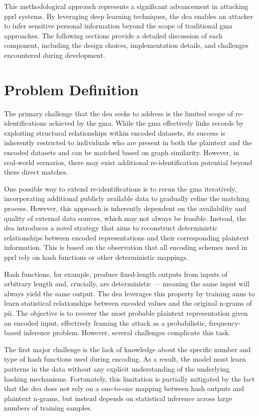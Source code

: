 This methodological approach represents a significant advancement in attacking \ac{pprl} systems.
By leveraging deep learning techniques, the \ac{dea} enables an attacker to infer sensitive personal information beyond the scope of traditional \ac{gma} approaches.
The following sections provide a detailed discussion of each component, including the design choices, implementation details, and challenges encountered during development.

\section{Problem Definition} \label{sec:problemdefinition}

The primary challenge that the \ac{dea} seeks to address is the limited scope of re-identifications achieved by the \ac{gma}.
While the \ac{gma} effectively links records by exploiting structural relationships within encoded datasets, its success is inherently restricted to individuals who are present in both the plaintext and the encoded datasets and can be matched based on graph similarity.
However, in real-world scenarios, there may exist additional re-identification potential beyond these direct matches.

One possible way to extend re-identifications is to rerun the \ac{gma} iteratively, incorporating additional publicly available data to gradually refine the matching process.
However, this approach is inherently dependent on the availability and quality of external data sources, which may not always be feasible.
Instead, the \ac{dea} introduces a novel strategy that aims to reconstruct deterministic relationships between encoded representations and their corresponding plaintext information.
This is based on the observation that all encoding schemes used in \ac{pprl} rely on hash functions or other deterministic mappings.

Hash functions, for example, produce fixed-length outputs from inputs of arbitrary length and, crucially, are deterministic — meaning the same input will always yield the same output.
The \ac{dea} leverages this property by training \ac{ann}s to learn statistical relationships between encoded values and the original n-grams of \ac{pii}.
The objective is to recover the most probable plaintext representation given an encoded input, effectively framing the attack as a probabilistic, frequency-based inference problem.
However, several challenges complicate this task.

The first major challenge is the lack of knowledge about the specific number and type of hash functions used during encoding.
As a result, the model must learn patterns in the data without any explicit understanding of the underlying hashing mechanisms.
Fortunately, this limitation is partially mitigated by the fact that the \ac{dea} does not rely on a one-to-one mapping between hash outputs and plaintext n-grams, but instead depends on statistical inference across large numbers of training samples.

